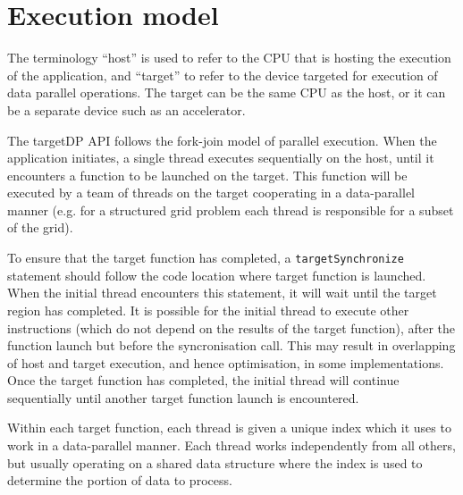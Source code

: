 \chapter{Execution model}

The terminology ``host'' is used to refer to the CPU that is hosting
the execution of the application, and ``target'' to refer to the
device targeted for execution of data parallel operations. The target
can be the same CPU as the host, or it can be a separate device such
as an accelerator. 

The targetDP API follows the fork-join model of parallel
execution. When the application initiates, a single thread executes
sequentially on the host, until it encounters a function to be
launched on the target. This function will be executed by a team of
threads on the target cooperating in a data-parallel manner (e.g. for
a structured grid problem each thread is responsible for a subset of
the grid). 

To ensure that the target function has completed, a
\verb+targetSynchronize+ statement should follow the code location
where target function is launched. When the initial thread encounters
this statement, it will wait until the target region has completed. It
is possible for the initial thread to execute other instructions
(which do not depend on the results of the target function), after the
function launch but before the syncronisation call. This may result in
overlapping of host and target execution, and hence optimisation, in
some implementations. Once the target function has completed, the
initial thread will continue sequentially until another target
function launch is encountered.

Within each target function, each thread is given a unique index which
it uses to work in a data-parallel manner. Each thread works
independently from all others, but usually operating on a shared data
structure where the index is used to determine the portion of data
to process.

\begin{comment}
Possibly add targetSyncThreads() to
  allow communication within target functions?]
\end{comment}

